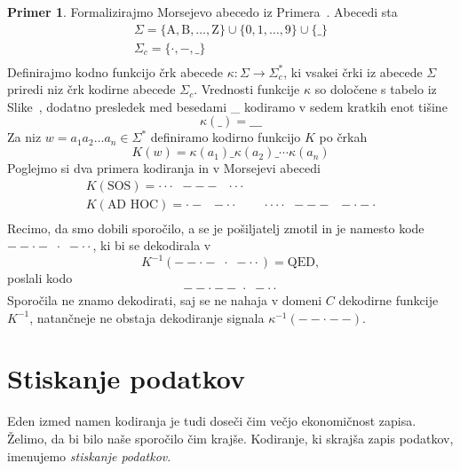 \documentclass{amsart}
\theoremstyle{definition} %
\newtheorem{primer}[definicija]{Primer}
\theoremstyle{plain} %
\begin{document}
\begin{primer}
    
    Formalizirajmo Morsejevo abecedo iz Primera~. Abecedi sta
    \begin{gather*}
        \Sigma = \{ \text{A},  \text{B}, \ldots, \text{Z} \} \cup \{ 0, 1, \ldots, 9 \} \cup \{ \_ \} \\
        \Sigma_c = \{ \cdot ,-, \_ \} \\
    \end{gather*}
    Definirajmo kodno funkcijo črk abecede $ \kappa \colon \Sigma \to \Sigma_c^* $, ki vsakei črki iz abecede
    $ \Sigma $ priredi niz črk kodirne abecede $ \Sigma_c $. Vrednosti funkcije $ \kappa $ so določene s
    tabelo iz Slike~, dodatno presledek med besedami \_  kodiramo v sedem kratkih enot tišine 
    \[
        \kappa(\_) = \_\_\_
    \]
    Za niz $ w = a_1a_2 \ldots a_n \in \Sigma^* $ definiramo kodirno 
    funkcijo $ K $ po črkah
    \[
        K(w) = \kappa(a_1)\_\kappa(a_2)\_\cdots\kappa(a_n)
    \]
    Poglejmo si dva primera kodiranja in v Morsejevi abecedi
    \begin{gather*}
        K(\text{SOS}) = \cdot\cdot\cdot \;\; --- \;\; \cdot\cdot\cdot \\
        K(\text{AD HOC}) = \cdot- \;\; -\cdot\cdot \qquad \cdot\cdot\cdot\cdot \;\; --- \;\; -\cdot-\cdot \\
    \end{gather*}
    Recimo, da smo dobili sporočilo, a se je pošiljatelj zmotil in je namesto kode 
    $ --\cdot- \,\, \cdot \,\, -\cdot\cdot $, ki bi se dekodirala v
    \[
        K^{-1}(--\cdot- \,\, \cdot \,\, -\cdot\cdot) = \text{QED},
        \]
    poslali kodo
    \[
        --\cdot-- \,\, \cdot \,\, -\cdot\cdot
    \]
    Sporočila ne znamo dekodirati, saj se ne nahaja v domeni $ C $ dekodirne funkcije $ K^{-1} $,
    natančneje ne obstaja dekodiranje signala $ \kappa^{-1}(--\cdot--) $.

\end{primer}

\section{Stiskanje podatkov}

Eden izmed namen kodiranja je tudi doseči čim večjo ekonomičnost zapisa. Želimo, da bi bilo naše sporočilo
čim krajše. Kodiranje, ki skrajša zapis podatkov, imenujemo \textit{stiskanje podatkov}.
\end{document}
